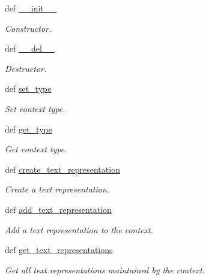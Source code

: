 \begin{DoxyCompactItemize}
\item 
def \hyperlink{classlmf_1_1src_1_1mrd_1_1context_1_1_context_acc18b0fe7b0db9c6e64e934ee67fc6a9}{\+\_\+\+\_\+init\+\_\+\+\_\+}
\begin{DoxyCompactList}\small\item\em Constructor. \end{DoxyCompactList}\item 
def \hyperlink{classlmf_1_1src_1_1mrd_1_1context_1_1_context_a490b0011c22dc5843ba7c6b176f3b72b}{\+\_\+\+\_\+del\+\_\+\+\_\+}
\begin{DoxyCompactList}\small\item\em Destructor. \end{DoxyCompactList}\item 
def \hyperlink{classlmf_1_1src_1_1mrd_1_1context_1_1_context_a4726cc609fc5d8edd15eca4f83a0712b}{set\+\_\+type}
\begin{DoxyCompactList}\small\item\em Set context type. \end{DoxyCompactList}\item 
def \hyperlink{classlmf_1_1src_1_1mrd_1_1context_1_1_context_a23bbf04da050eb93c8f0abb8a5eaf4aa}{get\+\_\+type}
\begin{DoxyCompactList}\small\item\em Get context type. \end{DoxyCompactList}\item 
def \hyperlink{classlmf_1_1src_1_1mrd_1_1context_1_1_context_ac7bd2a0ecf508291587d52cbae380e27}{create\+\_\+text\+\_\+representation}
\begin{DoxyCompactList}\small\item\em Create a text representation. \end{DoxyCompactList}\item 
def \hyperlink{classlmf_1_1src_1_1mrd_1_1context_1_1_context_a6e1527f4d3685b66da96af85a1db8d4e}{add\+\_\+text\+\_\+representation}
\begin{DoxyCompactList}\small\item\em Add a text representation to the context. \end{DoxyCompactList}\item 
def \hyperlink{classlmf_1_1src_1_1mrd_1_1context_1_1_context_a6dc9ce353b5e7e987615fec2d8a835d7}{get\+\_\+text\+\_\+representations}
\begin{DoxyCompactList}\small\item\em Get all text representations maintained by the context. \end{DoxyCompactList}\item 

\end{DoxyCompactItemize}
